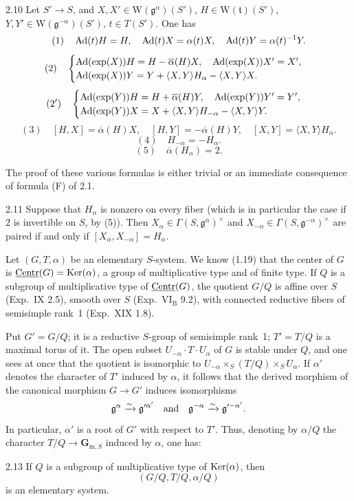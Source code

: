 \begin{lemma}{2.10}\label{XX.2.10}
Let $S'\to S$, and $X,X'\in\mathrm W(\mathfrak g^\alpha)(S')$, $H\in\mathrm W(\mathfrak t)(S')$, $Y,Y'\in\mathrm W(\mathfrak g^{-\alpha})(S')$, $t\in T(S')$. One has
\[
(1)\quad\operatorname{Ad}(t)H=H,\quad\operatorname{Ad}(t)X=\alpha(t)X,\quad\operatorname{Ad}(t)Y=\alpha(t)^{-1}Y.
\]
\[
(2)\quad\begin{cases}
\operatorname{Ad}(\exp(X))H=H-\overline\alpha(H)X,\quad\operatorname{Ad}(\exp(X))X'=X',\\
\operatorname{Ad}(\exp(X))Y=Y+\langle X,Y\rangle H_\alpha-\langle X,Y\rangle X.
\end{cases}
\]
\[
(2')\quad\begin{cases}
\operatorname{Ad}(\exp(Y))H=H+\overline\alpha(H)Y,\quad\operatorname{Ad}(\exp(Y))Y'=Y',\\
\operatorname{Ad}(\exp(Y))X=X+\langle X,Y\rangle H_{-\alpha}-\langle X,Y\rangle Y.
\end{cases}
\]
\[
(3)\quad[H,X]=\overline\alpha(H)X,\quad[H,Y]=-\overline\alpha(H)Y,\quad[X,Y]=\langle X,Y\rangle H_\alpha.
\]
\[
(4)\quad H_{-\alpha}=-H_\alpha.
\]
\[
(5)\quad\overline\alpha(H_\alpha)=2.
\]
\end{lemma}
The proof of these various formulas is either trivial or an immediate consequence of formula (F) of 2.1.

\begin{corollary}{2.11}\label{XX.2.11}
Suppose that $H_\alpha$ is nonzero on every fiber (which is in particular the case if $2$ is invertible on $S$, by (5)). Then $X_\alpha\in\Gamma(S,\mathfrak g^\alpha)^\times$ and $X_{-\alpha}\in\Gamma(S,\mathfrak g^{-\alpha})^\times$ are paired if and only if $[X_\alpha,X_{-\alpha}]=H_\alpha$.
\end{corollary}

 Let $(G,T,\alpha)$ be an elementary $S$-system. We know (1.19) that the center of $G$ is $\underline{\mathrm{Centr}}(G)=\operatorname{Ker}(\alpha)$, a group of multiplicative type and of finite type. If $Q$ is a subgroup of multiplicative type of $\underline{\mathrm{Centr}}(G)$, the quotient $G/Q$ is affine over $S$ (Exp.~IX 2.5), smooth over $S$ (Exp.~VI$_{\mathrm B}$ 9.2), with connected reductive fibers of semisimple rank~1 (Exp.~XIX 1.8).

Put $G'=G/Q$; it is a reductive $S$-group of semisimple rank~1; $T'=T/Q$ is a maximal torus of it. The open subset $U_{-\alpha}\cdot T\cdot U_\alpha$ of $G$ is stable under $Q$, and one sees at once that the quotient is isomorphic to $U_{-\alpha}\times_S(T/Q)\times_SU_\alpha$. If $\alpha'$ denotes the character of $T'$ induced by $\alpha$, it follows that the derived morphism of the canonical morphism $G\to G'$ induces isomorphisms
\[
\mathfrak g^\alpha\xrightarrow{\sim}\mathfrak g'^{\alpha'}\quad\text{and}\quad
\mathfrak g^{-\alpha}\xrightarrow{\sim}\mathfrak g'^{-\alpha'}.
\]
In particular, $\alpha'$ is a root of $G'$ with respect to $T'$. Thus, denoting by $\alpha/Q$ the character $T/Q\to\mathbf G_{\mathrm m,S}$ induced by $\alpha$, one has:
\begin{lemma}{2.13}\label{XX.2.13}
If $Q$ is a subgroup of multiplicative type of $\operatorname{Ker}(\alpha)$, then
\[
(G/Q,T/Q,\alpha/Q)
\]
is an elementary system.
\end{lemma}

